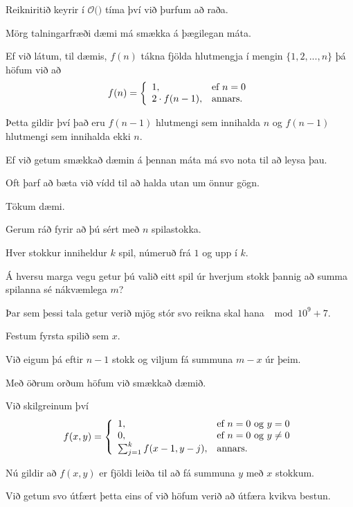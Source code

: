 {
}

{
	{
		\item<1-> Reikniritið keyrir í $\mathcal{O}($$)$ tíma því við þurfum að raða.
	}
}

{
	{
		\item<1-> Mörg talningarfræði dæmi má smækka á þægilegan máta.
		\item<2-> Ef við látum, til dæmis, $f(n)$ tákna fjölda hlutmengja í mengin $\{1, 2, ..., n\}$ þá höfum við að
		\[
			f(n) = \left \{
			\env{array}
			{ {l l}
				1, & \text{ef $n = 0$}\\
				2 \cdot f(n - 1), & \text{annars}.
			}
			\right .
		\]
		\item<3-> Þetta gildir því það eru $f(n - 1)$ hlutmengi sem innihalda $n$ og $f(n - 1)$ hlutmengi sem innihalda ekki $n$.
		\item<4-> Ef við getum smækkað dæmin á þennan máta má svo nota  til að leysa þau.
		\item<6-> Oft þarf að bæta við vídd til að halda utan um önnur gögn.
		\item<7-> Tökum dæmi.
	}
}

{
	{
		\item<1-> Gerum ráð fyrir að þú sért með $n$ spilastokka.
		\item<2-> Hver stokkur inniheldur $k$ spil, númeruð frá $1$ og upp í $k$.
		\item<3-> Á hversu marga vegu getur þú valið eitt spil úr hverjum stokk þannig að summa spilanna sé nákvæmlega $m$?
		\item<4-> Þar sem þessi tala getur verið mjög stór svo reikna skal hana $\mod 10^9 + 7$.
	}
}

{
	{
		\item<1-> Festum fyrsta spilið sem $x$.
		\item<2-> Við eigum þá eftir $n - 1$ stokk og viljum fá summuna $m - x$ úr þeim.
		\item<3-> Með öðrum orðum höfum við smækkað dæmið.
		\item<4-> Við skilgreinum því
		\[
			f(x, y) = \left \{
			\env{array}
			{ {l l}
				1, & \text{ef $n = 0$ og $y = 0$}\\
				0, & \text{ef $n = 0$ og $y \neq 0$}\\
				\sum_{j = 1}^k f(x - 1, y - j), & \text{annars}.
			}
			\right .
		\]
		\item<5-> Nú gildir að $f(x, y)$ er fjöldi leiða til að fá summuna $y$ með $x$ stokkum.
		\item<6-> Við getum svo útfært þetta eins of við höfum verið að útfæra kvikva bestun.
	}
}

